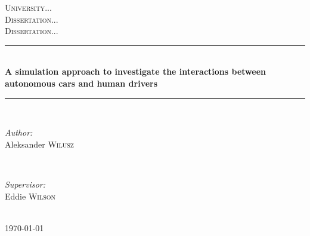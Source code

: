 \documentclass[11pt,english]{article}
\begin{document}

\begin{titlepage}

\newcommand{\HRule}{\rule{\linewidth}{0.5mm}} %

\center %

\textsc{\LARGE University...}\\[1.5cm] %
\textsc{\Large Dissertation...}\\[0.5cm] %
\textsc{\large Dissertation...}\\[0.5cm] %

\HRule \\[0.4cm]
{ \huge \bfseries A simulation approach to investigate the interactions between autonomous cars and human drivers}\\[0.4cm] %
\HRule \\[1.5cm]

\begin{minipage}{0.4\textwidth}
\begin{flushleft} \large
\emph{Author:}\\
Aleksander \textsc{Wilusz} %
\end{flushleft}
\end{minipage}
~
\begin{minipage}{0.4\textwidth}
\begin{flushright} \large
\emph{Supervisor:} \\
Eddie \textsc{Wilson} %
\end{flushright}
\end{minipage}\\[4cm]



{\large \today}\\[3cm] %


\vfill %

\end{titlepage}
\end{document}
